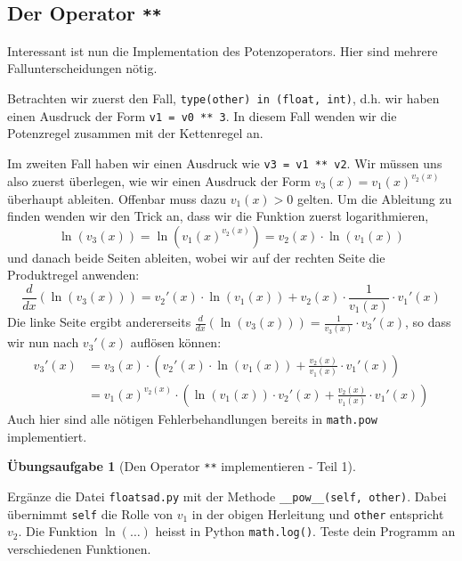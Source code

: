 \documentclass[
  letterpaper,
  DIV=11,
  oneside]{scrreprt}
\theoremstyle{definition}
\newtheorem{exercise}{Übungsaufgabe}[chapter]
\theoremstyle{definition}
\theoremstyle{remark}
\begin{document}
\hypertarget{der-operator}{%
\subsection{\texorpdfstring{Der Operator
\texttt{**}}{Der Operator **}}\label{der-operator}}

Interessant ist nun die Implementation des Potenzoperators. Hier sind
mehrere Fallunterscheidungen nötig.

Betrachten wir zuerst den Fall, \texttt{type(other)\ in\ (float,\ int)},
d.h. wir haben einen Ausdruck der Form \texttt{v1\ =\ v0\ **\ 3}. In
diesem Fall wenden wir die Potenzregel zusammen mit der Kettenregel an.

Im zweiten Fall haben wir einen Ausdruck wie \texttt{v3\ =\ v1\ **\ v2}.
Wir müssen uns also zuerst überlegen, wie wir einen Ausdruck der Form
\(v_3 (x) = v_1(x) ^{v_2 (x)}\) überhaupt ableiten. Offenbar muss dazu
\(v_1(x) > 0\) gelten. Um die Ableitung zu finden wenden wir den Trick
an, dass wir die Funktion zuerst logarithmieren, \[
\ln(v_3(x)) = \ln(v_1(x) ^{v_2 (x)}) = v_2(x) \cdot \ln(v_1(x))
\] und danach beide Seiten ableiten, wobei wir auf der rechten Seite die
Produktregel anwenden: \[
\frac{d}{dx}(\ln(v_3(x))) = v_2'(x) \cdot \ln(v_1(x)) + v_2(x) \cdot \frac{1}{v_1(x)} \cdot v_1'(x)
\] Die linke Seite ergibt andererseits
\(\frac{d}{dx}(\ln(v_3(x))) = \frac{1}{v_3(x)}\cdot v_3'(x)\), so dass
wir nun nach \(v_3'(x)\) auflösen können: \[
\begin{flalign}
    v_3'(x) &= v_3(x) \cdot \left( v_2'(x) \cdot \ln(v_1(x)) + \frac{v_2(x)}{v_1(x)} \cdot v_1'(x) \right) \\ 
    &= v_1(x) ^{v_2 (x)} \cdot \left( \ln(v_1(x)) \cdot v_2'(x) + \frac{v_2(x)}{v_1(x)} \cdot v_1'(x) \right)
\end{flalign}
\] Auch hier sind alle nötigen Fehlerbehandlungen bereits in
\texttt{math.pow} implementiert.

\leavevmode{}%
\begin{exercise}[Den Operator \texttt{**} implementieren - Teil
1]\label{exr-ImplementPow}

Ergänze die Datei \texttt{floatsad.py} mit der Methode
\texttt{\_\_pow\_\_(self,\ other)}. Dabei übernimmt \texttt{self} die
Rolle von \(v_1\) in der obigen Herleitung und \texttt{other} entspricht
\(v_2\). Die Funktion \(\ln(\ldots)\) heisst in Python
\texttt{math.log()}. Teste dein Programm an verschiedenen Funktionen.

\end{exercise}
\end{document}
